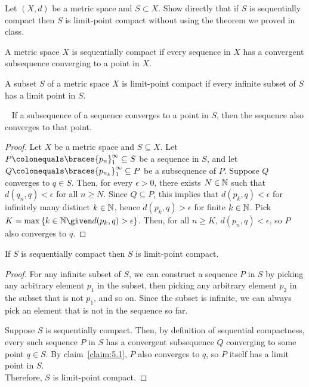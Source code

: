 \begin{problem}
  Let $(X, d)$ be a metric space and $S \subset X$.
  Show directly that if $S$ is sequentially compact
  then $S$ is limit-point compact without using the
  theorem we proved in class.
\end{problem}
\begin{answer}
  \begin{definition}
    A metric space $X$ is sequentially compact if every sequence in $X$
    has a convergent subsequence converging to a point in $X$.
  \end{definition}

  \begin{definition}
    A subset $S$ of a metric space $X$ is limit-point compact if every infinite subset of $S$
    has a limit point in $S$.
  \end{definition}

  \begin{claim}~\label{claim:5.1}
    If a subsequence of a sequence converges to a point in $S$,
    then the sequence also converges to that point.

    \begin{proof}
      Let $X$ be a metric space and $S \subseteq X$.
      Let $P \colonequals \braces{p_n}_1^\infty \subseteq S$ be a sequence in $S$,
      and let $Q \colonequals \braces{p_{n_k}}_1^\infty \subseteq P$ be a subsequence of $P$.
      Suppose $Q$ converges to $q \in S$.
      Then, for every $\epsilon > 0$, there exists $N \in \mathbb{N}$ such that
      $d(q_n, q) < \epsilon$ for all $n \geq N$.
      Since $Q \subseteq P$, this implies that $d(p_k, q) < \epsilon$ for
      infinitely many distinct $k \in \mathbb{N}$,
      hence $d(p_k, q) > \epsilon$ for finite $k \in \mathbb{N}$.
      Pick $K = \max \set{k \in \N \given d(p_k, q) > \epsilon}$.
      Then, for all $n \geq K$, $d(p_n, q) < \epsilon$,
      so $P$ also converges to $q$.
    \end{proof}
  \end{claim}

  \begin{claim}
    If $S$ is sequentially compact then $S$ is limit-point compact.

    \begin{proof}
      For any infinite subset of $S$,
      we can construct a sequence $P$ in $S$ by picking any arbitrary
      element $p_1$ in the subset,
      then picking any arbitrary element $p_2$ in the subset that is not $p_1$,
      and so on.
      Since the subset is infinite, we can always pick an element that is not
      in the sequence so far.

      \step
      Suppose $S$ is sequentially compact.
      Then, by definition of sequential compactness,
      every such sequence $P$ in $S$ has a convergent subsequence
      $Q$ converging to some point $q \in S$.
      By claim~\ref{claim:5.1}, $P$ also converges to $q$,
      so $P$ itself has a limit point in $S$. \\
      Therefore, $S$ is limit-point compact.
    \end{proof}
  \end{claim}
\end{answer}
